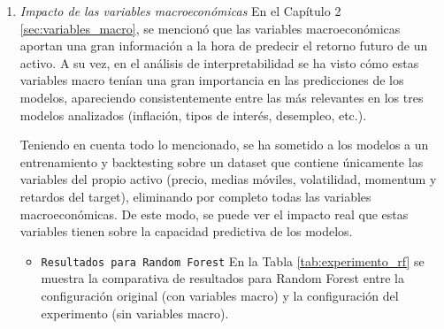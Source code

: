 \begin{enumerate}
    \item \emph{Impacto de las variables macroeconómicas}
    En el Capítulo 2 \ref{sec:variables_macro}, se mencionó que las variables macroeconómicas aportan una gran información a la hora de predecir el retorno futuro de un activo. A su vez, en el análisis de interpretabilidad se ha visto cómo estas variables macro tenían una gran importancia en las predicciones de los modelos, apareciendo consistentemente entre las más relevantes en los tres modelos analizados (inflación, tipos de interés, desempleo, etc.).
    
    Teniendo en cuenta todo lo mencionado, se ha sometido a los modelos a un entrenamiento y backtesting sobre un dataset que contiene únicamente las variables del propio activo (precio, medias móviles, volatilidad, momentum y retardos del target), eliminando por completo todas las variables macroeconómicas. De este modo, se puede ver el impacto real que estas variables tienen sobre la capacidad predictiva de los modelos.
    
    \begin{itemize}
        \item \texttt{Resultados para Random Forest}
        En la Tabla \ref{tab:experimento_rf} se muestra la comparativa de resultados para Random Forest entre la configuración original (con variables macro) y la configuración del experimento (sin variables macro).


\end{itemize}
\end{enumerate}
